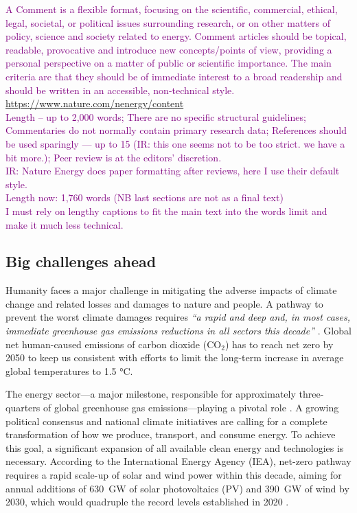 \documentclass[pdflatex,sn-basic, Numbered]{sn-jnl}%
\theoremstyle{thmstyleone}%
\theoremstyle{thmstyletwo}%
\theoremstyle{thmstylethree}%
\newcommand{\comment}[1]{\textcolor{purple}{#1}}
\begin{document}
\comment{
A Comment is a flexible format, focusing on the scientific, commercial, ethical, legal, societal, or political issues surrounding research, or on other matters of policy, science and society related to energy. Comment articles should be topical, readable, provocative and introduce new concepts/points of view, providing a personal perspective on a matter of public or scientific importance. The main criteria are that they should be of immediate interest to a broad readership and should be written in an accessible, non-technical style. \href{https://www.nature.com/nenergy/content}{https://www.nature.com/nenergy/content}\\}
\comment{
\noindent Length -- up to 2,000 words; There are no specific structural guidelines; Commentaries do not normally contain primary research data; References should be used sparingly --- up to 15 (IR: this one seems not to be too strict. we have a bit more.); Peer review is at the editors' discretion. \\
IR: Nature Energy does paper formatting after reviews, here I use their default style.\\
Length now: 1,760 words (NB last sections are not as a final text) \\
I must rely on lengthy captions to fit the main text into the words limit and make it much less technical.
}


\subsection*{Big challenges ahead}\label{sec1}

Humanity faces a major challenge in mitigating the adverse impacts of climate change and related losses and damages to nature and people.
A pathway to prevent the worst climate damages requires \textit{\enquote{a rapid and deep and, in most cases, immediate greenhouse gas emissions reductions in all sectors this decade}} \cite{ipccAR6SynthesisReport2023}.
Global net human-caused emissions of carbon dioxide (CO$_2$) has to reach net zero by 2050 to keep us consistent with efforts to limit the long-term increase in average global temperatures to 1.5 °C.

The energy sector—a major milestone, responsible for approximately three-quarters of global greenhouse gas emissions—playing a pivotal role \cite{ieaNetZero20502021}.
A growing political consensus and national climate initiatives are calling for a complete transformation of how we produce, transport, and consume energy.
To achieve this goal, a significant expansion of all available  clean energy and technologies is necessary.
According to the International Energy Agency (IEA), net-zero pathway requires a rapid scale-up of solar and wind power within this decade, aiming for annual additions of 630~GW of solar photovoltaics (PV) and 390~GW of wind by 2030, which would quadruple the record levels established in 2020 \cite{ieaNetZero20502021}.
\end{document}
